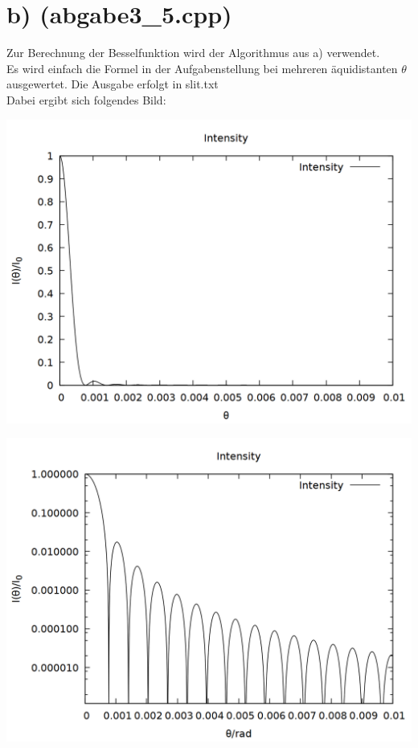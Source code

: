 \documentclass{scrartcl}
\begin{document}
\section*{b) (abgabe3\_5.cpp)}
Zur Berechnung der Besselfunktion wird der Algorithmus aus a) verwendet.\\
Es wird einfach die Formel in der Aufgabenstellung bei mehreren äquidistanten $\theta$ ausgewertet. Die Ausgabe erfolgt in slit.txt\\

Dabei ergibt sich folgendes Bild:\\
\begin{center}
\includegraphics[scale=0.3]{plot_slit.png}
\end{center}
\begin{center}
\includegraphics[scale=0.3]{plot_slit_log.png}
\end{center}
\end{document}
